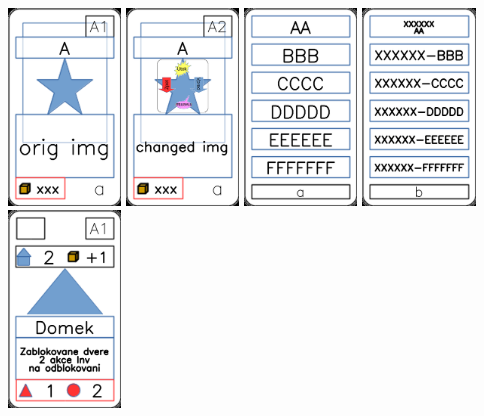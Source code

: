 \documentclass[a4paper]{article}
\begin{document}
	\includegraphics[width=3.0cm]{img-1-1_0}
	\includegraphics[width=3.0cm]{img-1-2_0}
	\includegraphics[width=3.0cm]{img-2-1_0}
	\includegraphics[width=3.0cm]{img-2-2_0}
	\includegraphics[width=3.0cm]{img-3_0}
\end{document}
